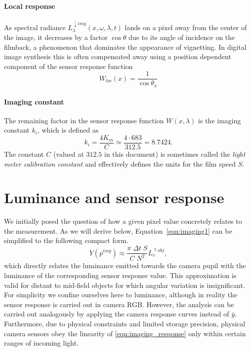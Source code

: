 \paragraph{Local response}
As spectral radiance $L^{\downarrow img}_{\lambda}(x, \omega, \lambda, t)$ lands
on a pixel away from the center of the image, it decreases by a factor
$\cos\theta$ due to its angle of incidence on the filmback, a phenomenon that
dominates the appearance of vignetting. In digital image synthesis this is often
compensated away using a position dependent component of the sensor response
function
\begin{equation}
W_{loc}(x) = \frac{1}{\cos\theta_x}
\end{equation}

\paragraph{Imaging constant}

The remaining factor in the sensor response function $W(x,\lambda)$ is the
imaging constant $k_i$, which is defined as
\begin{equation}\label{eqn:imaging_ki}
 k_i = \frac{4K_m}{C} \simeq \frac{4\cdot683}{312.5} = 8.7424.
\end{equation}
The constant $C$ (valued at $312.5$ in this document) is sometimes called the \textsl{light meter
calibration constant} and effectively defines the units for the film speed $S$.


\section{Luminance and sensor response}

We initially posed the question of how a given pixel value concretely
relates to the measurement. As we will derive below,
Equation~\eqref{eqn:imaging1} can be simplified to the following
compact form.
\begin{equation}\label{eqn:imaging_response}
  Y(p^{img}) \approx \frac{ \pi\;\Delta t\;S}{C\; N^2} L_v^{\uparrow obj},
\end{equation}
which directly relates the luminance emitted towards the camera pupil
with the luminance of the corresponding sensor response value. This approximation
is valid for distant to mid-field objects for which angular variation
is insignificant. For simplicity we confine ourselves here to luminance, although in
reality the sensor response is carried out in camera RGB. However, the
analysis can be carried out analogously by applying the camera
response curves instead of $\bar y$. Furthermore, due to physical
constraints and limited storage precision, physical camera sensors
obey the linearity of \eqref{eqn:imaging_response} only within certain
ranges of incoming light.


